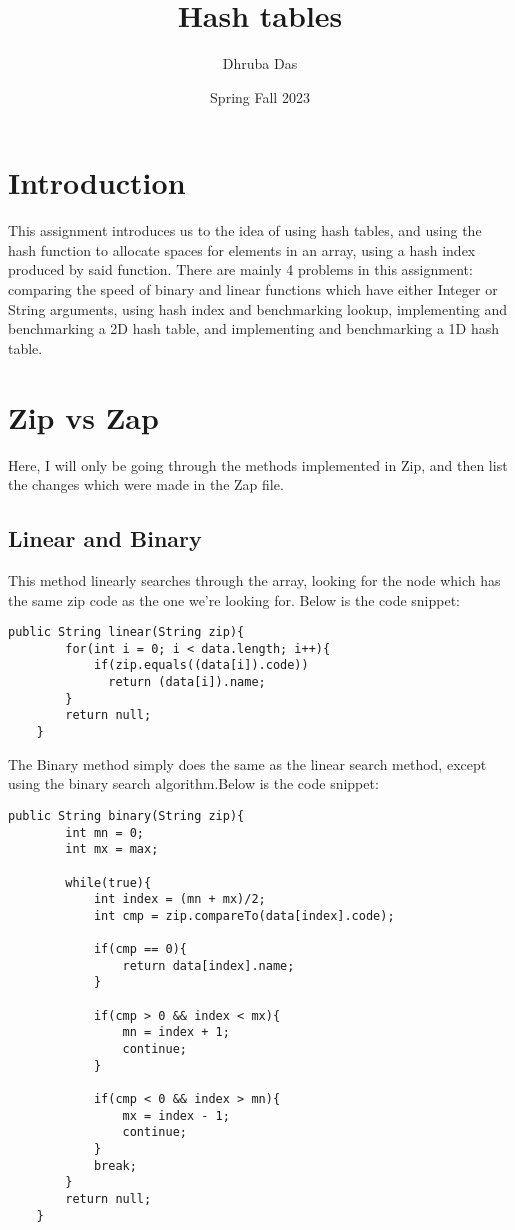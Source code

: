 \documentclass[a4paper,11pt]{article}
\begin{document}
\title{
    \textbf{Hash tables}
}
\author{Dhruba Das}
\date{Spring Fall 2023}

\maketitle

\section*{Introduction}
This assignment introduces us to the idea of using hash tables, and using the hash function to allocate spaces for elements in an array, using a hash index produced by said function. There are mainly 4 problems in this assignment: comparing the speed of binary and linear functions which have either Integer or String arguments, using hash index and benchmarking lookup,  implementing and benchmarking a 2D hash table, and implementing and benchmarking a 1D hash table.

\section*{Zip vs Zap}
Here, I will only be going through the methods implemented in Zip, and then list the changes which were made in the Zap file.

\subsection*{Linear and Binary}
This method linearly searches through the array, looking for the node which has the same zip code as the one we're looking for. Below is the code snippet:

\begin{verbatim}
public String linear(String zip){
        for(int i = 0; i < data.length; i++){
            if(zip.equals((data[i]).code))
              return (data[i]).name;
        }
        return null;
    }
\end{verbatim}

The Binary method simply does the same as the linear search method, except using the binary search algorithm.Below is the code snippet:

\begin{verbatim}
public String binary(String zip){
        int mn = 0;
        int mx = max;

        while(true){
            int index = (mn + mx)/2;
            int cmp = zip.compareTo(data[index].code);

            if(cmp == 0){
                return data[index].name;
            }

            if(cmp > 0 && index < mx){
                mn = index + 1;
                continue;
            }

            if(cmp < 0 && index > mn){
                mx = index - 1;
                continue;
            }
            break;
        }
        return null;
    }
\end{verbatim}
\end{document}

